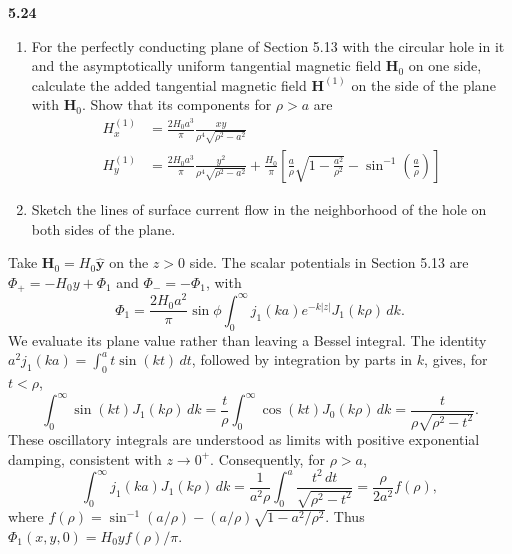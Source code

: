 \par\bigskip
\noindent\textbf{5.24}\quad\begin{enumerate}
\item[(a)] For the perfectly conducting plane of Section 5.13 with the circular hole in it and the asymptotically uniform tangential magnetic field $\mathbf{H}_{0}$ on one side, calculate the added tangential magnetic field $\mathbf{H}^{(1)}$ on the side of the plane with $\mathbf{H}_{0}$. Show that its components for $\rho>a$ are
\begin{align*}
H_{x}^{(1)}&=\frac{2H_{0}a^{3}}{\pi}\frac{xy}{\rho^{4}\sqrt{\rho^{2}-a^{2}}}\\[4pt]
H_{y}^{(1)}&=\frac{2H_{0}a^{3}}{\pi}\frac{y^{2}}{\rho^{4}\sqrt{\rho^{2}-a^{2}}}+\frac{H_{0}}{\pi}\left[\frac{a}{\rho}\sqrt{1-\frac{a^{2}}{\rho^{2}}}-\sin^{-1}\!\left(\frac{a}{\rho}\right)\right]
\end{align*}
\item[(b)] Sketch the lines of surface current flow in the neighborhood of the hole on both sides of the plane.
\end{enumerate}
\solution
Take $\mathbf H_0=H_0\widehat{\mathbf y}$ on the $z>0$ side.
The scalar potentials in Section 5.13 are
$\Phi_+=-H_0y+\Phi_1$ and $\Phi_-=-\Phi_1$, with
\[
\Phi_1=\frac{2H_0a^2}{\pi}\sin\phi
\int_0^\infty j_1(ka)e^{-k|z|}J_1(k\rho)\,dk.
\]
We evaluate its plane value rather than leaving a Bessel integral.
The identity
$a^2j_1(ka)=\int_0^a t\sin(kt)\,dt$, followed by integration by parts
in $k$, gives, for $t<\rho$,
\[
\int_0^\infty\sin(kt)J_1(k\rho)\,dk
=\frac t\rho\int_0^\infty\cos(kt)J_0(k\rho)\,dk
=\frac{t}{\rho\sqrt{\rho^2-t^2}}.
\]
These oscillatory integrals are understood as limits with positive
exponential damping, consistent with $z\to0^+$.
Consequently, for $\rho>a$,
\[
\int_0^\infty j_1(ka)J_1(k\rho)\,dk
=\frac1{a^2\rho}\int_0^a\frac{t^2\,dt}{\sqrt{\rho^2-t^2}}
=\frac{\rho}{2a^2}f(\rho),
\]
where
$f(\rho)=\sin^{-1}(a/\rho)-(a/\rho)\sqrt{1-a^2/\rho^2}$.
Thus $\Phi_1(x,y,0)=H_0yf(\rho)/\pi$.

